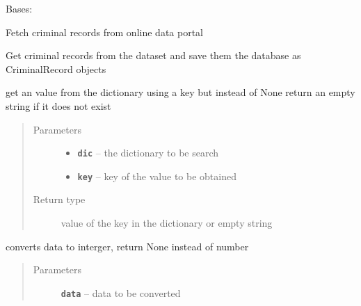 \documentclass[letterpaper,10pt,english]{sphinxmanual}
\begin{document}
\begin{fulllineitems}
\label{api/crime:crime.views.FetchCrimesView}
Bases: 

Fetch criminal records from online data portal

\begin{fulllineitems}
\label{api/crime:crime.views.FetchCrimesView.get}
Get criminal records from the dataset and save them the database as CriminalRecord objects

\end{fulllineitems}


\begin{fulllineitems}
\label{api/crime:crime.views.FetchCrimesView.get_from_dict}
get an value from the dictionary using a key but instead of None
return an empty string if it does not exist
\begin{quote}\begin{description}
\item[{Parameters}] \leavevmode\begin{itemize}
\item {} 
\textbf{\texttt{dic}} -- the dictionary to be search

\item {} 
\textbf{\texttt{key}} -- key of the value to be obtained

\end{itemize}

\item[{Return type}] \leavevmode
value of the key in the dictionary or empty string

\end{description}\end{quote}

\end{fulllineitems}


\begin{fulllineitems}
\label{api/crime:crime.views.FetchCrimesView.to_int}
converts data to interger, return None instead of number
\begin{quote}\begin{description}
\item[{Parameters}] \leavevmode
\textbf{\texttt{data}} -- data to be converted


\end{description}
\end{quote}
\end{fulllineitems}
\end{fulllineitems}
\end{document}
